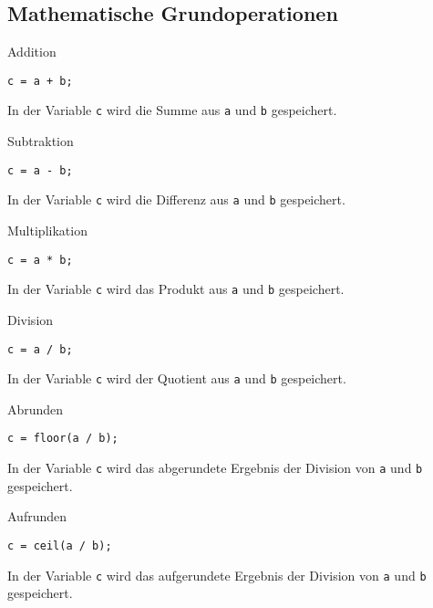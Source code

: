         \subsection{Mathematische Grundoperationen}
            \begin{CodeErklaerungBox}{Addition}
                \begin{lstlisting}
c = a + b;
                \end{lstlisting}
                \tcblower
                In der Variable \texttt{c} wird die Summe aus \texttt{a} und \texttt{b} gespeichert.
                \end{CodeErklaerungBox}
                \begin{CodeErklaerungBox}{Subtraktion}
                \begin{lstlisting}
c = a - b;
                \end{lstlisting}
                \tcblower
                In der Variable \texttt{c} wird die Differenz aus \texttt{a} und \texttt{b} gespeichert.
                \end{CodeErklaerungBox}
                \begin{CodeErklaerungBox}{Multiplikation}
                \begin{lstlisting}
c = a * b;
                \end{lstlisting}
                \tcblower
                In der Variable \texttt{c} wird das Produkt aus \texttt{a} und \texttt{b} gespeichert.
                \end{CodeErklaerungBox}
                \begin{CodeErklaerungBox}{Division}
                \begin{lstlisting}
c = a / b;
                \end{lstlisting}
                \tcblower
                In der Variable \texttt{c} wird der Quotient aus \texttt{a} und \texttt{b} gespeichert.
                \end{CodeErklaerungBox}
                \begin{CodeErklaerungBox}{Abrunden}
                \begin{lstlisting}
c = floor(a / b);
                \end{lstlisting}
                \tcblower
                In der Variable \texttt{c} wird das abgerundete Ergebnis der Division von \texttt{a} und \texttt{b} gespeichert.
                \end{CodeErklaerungBox}
                \begin{CodeErklaerungBox}{Aufrunden}
                \begin{lstlisting}
c = ceil(a / b);
                \end{lstlisting}
                \tcblower
                In der Variable \texttt{c} wird das aufgerundete Ergebnis der Division von \texttt{a} und \texttt{b} gespeichert.
                \end{CodeErklaerungBox}
